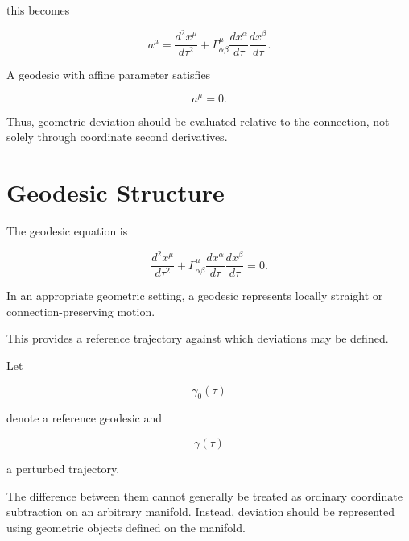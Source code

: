 \documentclass[12pt,oneside]{book}
\begin{document}
this becomes

\begin{equation}
    a^\mu
    =
    \frac{d^2x^\mu}{d\tau^2}
    +
    \Gamma^\mu_{\alpha\beta}
    \frac{dx^\alpha}{d\tau}
    \frac{dx^\beta}{d\tau}.
    \label{eq:trajectory-covariant-acceleration}
\end{equation}

A geodesic with affine parameter satisfies

\begin{equation}
    a^\mu
    =
    0.
    \label{eq:zero-covariant-acceleration}
\end{equation}

Thus, geometric deviation should be evaluated relative to the
connection, not solely through coordinate second derivatives.


\section{Geodesic Structure}
\label{sec:geodesic-structure}

The geodesic equation is

\begin{equation}
    \frac{d^2x^\mu}{d\tau^2}
    +
    \Gamma^\mu_{\alpha\beta}
    \frac{dx^\alpha}{d\tau}
    \frac{dx^\beta}{d\tau}
    =
    0.
    \label{eq:chapter-three-geodesic}
\end{equation}

In an appropriate geometric setting, a geodesic represents
locally straight or connection-preserving motion.

This provides a reference trajectory against which deviations
may be defined.

Let

\begin{equation}
    \gamma_0(\tau)
\end{equation}

denote a reference geodesic and

\begin{equation}
    \gamma(\tau)
\end{equation}

a perturbed trajectory.

The difference between them cannot generally be treated as
ordinary coordinate subtraction on an arbitrary manifold.
Instead, deviation should be represented using geometric
objects defined on the manifold.
\end{document}
